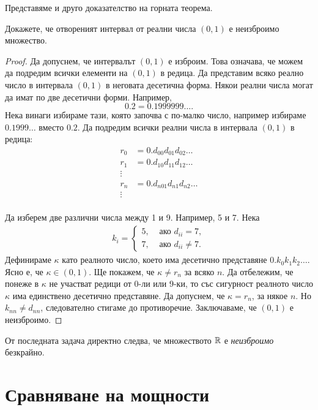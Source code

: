 Представяме и друго доказателство на горната теорема.
\begin{problem}
  Докажете, че отвореният интервал от реални числа $(0,1)$ е неизброимо множество.
\end{problem}
\begin{proof}
  Да допуснем, че интервалът $(0,1)$ е изброим. Това означава, че можем да подредим всички елементи на $(0,1)$ в редица.
  Да представим всяко реално число в интервала $(0,1)$ в неговата десетична форма.
  Някои реални числа могат да имат по две десетични форми.
  Например, 
  \[0.2 = 0.1999999\dots.\]
  Нека винаги избираме тази, която започва с по-малко число, например избираме $0.1999\dots$ вместо $0.2$.
  Да подредим всички реални числа в интервала $(0,1)$ в редица:
  \begin{align*}
    r_0 & = 0.d_{00}d_{01}d_{02}\dots\\
    r_1 & = 0.d_{10}d_{11}d_{12}\dots\\
    \vdots\\
    r_n & = 0.d_{n01}d_{n1}d_{n2}\dots\\
    \vdots\\
  \end{align*}

  Да изберем две различни числа между 1 и 9. Например, 5 и 7.
  Нека 
  \begin{align*}
    k_i = 
    \begin{cases}
      5, & \mbox{ ако } d_{ii} = 7,\\
      7, & \mbox{ ако } d_{ii} \neq 7.
    \end{cases}
  \end{align*}
  Дефинираме $\kappa$ като реалното число, което има десетично представяне $0.k_0k_1k_2\dots$.
  Ясно е, че $\kappa \in (0,1)$. Ще покажем, че $\kappa \neq r_n$ за всяко $n$.
  Да отбележим, че понеже в $\kappa$ не участват редици от $0$-ли или $9$-ки, то със сигурност 
  реалното число $\kappa$ има единствено десетично представяне.
  Да допуснем, че $\kappa = r_n$, за някое $n$.
  Но $k_{nn} \neq d_{nn}$, следователно стигаме до противоречие.
  Заключаваме, че $(0,1)$ е неизброимо.
\end{proof}

\begin{remark}
  От последната задача директно следва, че множеството $\mathbb{R}$ е {\em неизброимо} безкрайно.
\end{remark}

\section{Сравняване на мощности}

